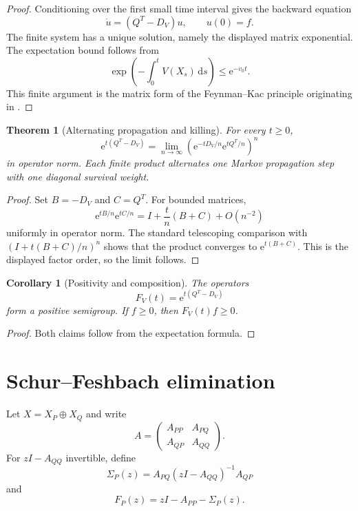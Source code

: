 \documentclass[11pt,letterpaper]{article}
\newtheorem{theorem}{Theorem}[section]
\theoremstyle{plain}
\theoremstyle{plain}
\theoremstyle{plain}
\newtheorem{corollary}[corollary]{Corollary}
\theoremstyle{definition}
\theoremstyle{definition}
\theoremstyle{definition}
\theoremstyle{definition}
\theoremstyle{definition}
\theoremstyle{remark}
\theoremstyle{remark}
\theoremstyle{remark}
\theoremstyle{remark}
\theoremstyle{remark}
\theoremstyle{remark}
\newcommand{\e}{\mathrm e}
\newcommand{\dd}{\,\mathrm d}
\let\KomorebiPrimitivemathrm\mathrm
\renewcommand{\mathrm}[1]{{\KomorebiPrimitivemathrm{#1}}}
\begin{document}
\begin{proof}
Conditioning over the first small time interval gives the backward equation
\[
\dot u=(Q^T-D_V)u,
\qquad
u(0)=f.
\]
The finite system has a unique solution, namely the displayed matrix exponential. The expectation bound follows from
\[
\exp\left(-\int_0^tV(X_s)\dd s\right)
\leq
\e^{-v_0t}.
\]
This finite argument is the matrix form of the Feynman--Kac principle originating in \cite{Kac1949}.
\end{proof}

\begin{theorem}[Alternating propagation and killing]\label{extended:record:083}\label{extended:thm:feynman_kac_product}
For every \(t\geq0\),
\[
\e^{t(Q^T-D_V)}
=
\lim_{n\to\infty}
\left(
\e^{-tD_V/n}\e^{tQ^T/n}
\right)^n
\]
in operator norm. Each finite product alternates one Markov propagation step with one diagonal survival weight.
\end{theorem}

\begin{proof}
Set \(B=-D_V\) and \(C=Q^T\). For bounded matrices,
\[
\e^{tB/n}\e^{tC/n}
=
I+\frac{t}{n}(B+C)+O(n^{-2})
\]
uniformly in operator norm. The standard telescoping comparison with
\(
(I+t(B+C)/n)^n
\)
shows that the product converges to \(\e^{t(B+C)}\). This is the displayed factor order, so the limit follows.
\end{proof}

\begin{corollary}[Positivity and composition]\label{extended:record:084}\label{extended:cor:feynman_kac_semigroup}
The operators
\[
F_V(t)=\e^{t(Q^T-D_V)}
\]
form a positive semigroup. If \(f\geq0\), then \(F_V(t)f\geq0\).
\end{corollary}

\begin{proof}
Both claims follow from the expectation formula.
\end{proof}

\FloatBarrier
\section{Schur--Feshbach elimination}\label{extended:section:14}\label{extended:sec:feshbach}

Let \(X=X_P\oplus X_Q\) and write
\[
A=
\begin{pmatrix}
A_{PP}&A_{PQ}\\
A_{QP}&A_{QQ}
\end{pmatrix}.
\]
For \(zI-A_{QQ}\) invertible, define
\[
\Sigma_P(z)
=
A_{PQ}(zI-A_{QQ})^{-1}A_{QP}
\]
and
\[
F_P(z)
=
zI-A_{PP}-\Sigma_P(z).
\]
\end{document}
